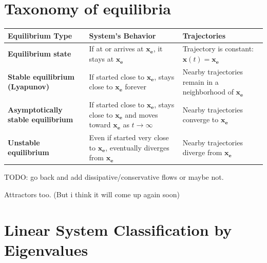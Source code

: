 \documentclass{report}
\begin{document}
\section*{Taxonomy of equilibria}

\begin{table}[h!]
\centering
\renewcommand{\arraystretch}{1.3}
\setlength{\tabcolsep}{8pt}
\begin{tabular}{>{\bfseries}m{3.5cm} m{6cm} m{5cm}}
\textbf{Equilibrium Type} & \textbf{System’s Behavior} & \textbf{Trajectories} \\ 
\midrule
Equilibrium state &
If at or arrives at $\mathbf{x_e}$, it stays at $\mathbf{x_e}$ &
Trajectory is constant: $\mathbf{x}(t) = \mathbf{x_e}$ \\

Stable equilibrium (Lyapunov) &
If started close to $\mathbf{x_e}$, stays close to $\mathbf{x_e}$ forever &
Nearby trajectories remain in a neighborhood of $\mathbf{x_e}$ \\

Asymptotically stable equilibrium &
If started close to $\mathbf{x_e}$, stays close to $\mathbf{x_e}$ and moves toward $\mathbf{x_e}$ as $t \to \infty$ &
Nearby trajectories converge to $\mathbf{x_e}$ \\

Unstable equilibrium &
Even if started very close to $\mathbf{x_e}$, eventually diverges from $\mathbf{x_e}$ &
Nearby trajectories diverge from $\mathbf{x_e}$ \\
\bottomrule
\end{tabular}
\end{table}

TODO: go back and add dissipative/conservative flows or maybe not. 

Attractors too. (But i think it will come up again soon)

\section*{Linear System Classification by Eigenvalues}

 


\end{document}
